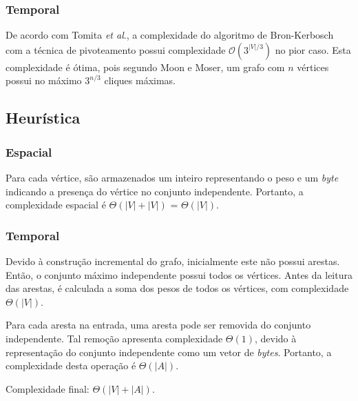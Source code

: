 \documentclass{article}
\begin{document}
\subsubsection{Temporal}
De acordo com Tomita \textit{et al}.\cite{TOMITA200628}, a complexidade do algoritmo de Bron-Kerbosch com a técnica de \mbox{pivoteamento} possui complexidade $\mathcal{O}(3^{|V|/3})$ no pior caso. Esta complexidade é ótima, pois segundo Moon e Moser\cite{Moon1965}, um grafo com $n$ vértices possui no máximo $3^{n/3}$ cliques máximas.

\subsection{Heurística}
\subsubsection{Espacial}
Para cada vértice, são armazenados um inteiro representando o peso e um \textit{byte} indicando a presença do vértice no conjunto independente. Portanto, a complexidade espacial é $\Theta(|V| + |V|)$ = $\Theta(|V|)$.
\subsubsection{Temporal}
Devido à construção incremental do grafo, inicialmente este não possui arestas. Então, o conjunto máximo independente possui todos os vértices. Antes da leitura das arestas, é calculada a soma dos pesos de todos os vértices, com complexidade $\Theta(|V|)$.

Para cada aresta na entrada, uma aresta pode ser removida do conjunto independente. Tal remoção apresenta complexidade $\Theta(1)$, devido à representação do conjunto independente como um vetor de \textit{bytes}. Portanto, a complexidade desta operação é $\Theta(|A|)$.

Complexidade final: $\Theta(|V| + |A|)$.


\pagebreak
\end{document}
